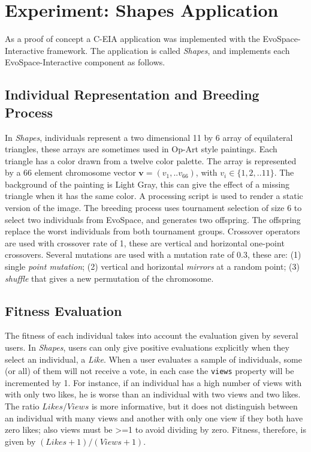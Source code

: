 \documentclass{llncs}
\begin{document}
\section{Experiment: Shapes Application}
\label{sec:experiments}
As a proof of concept a C-EIA application was implemented with the EvoSpace-Interactive framework.
The application is called \emph{Shapes}, and implements each EvoSpace-Interactive component as follows.

\subsection{Individual Representation and Breeding Process}
In \emph{Shapes}, individuals represent a two dimensional 11 by 6 array of equilateral triangles, these arrays are sometimes used in Op-Art style paintings.
Each triangle has a color drawn from a twelve color palette.
The array is represented by a 66 element chromosome vector $\mathbf{v}=(v_1,..v_{66})$, with $v_i \in \{ 1,2,..11 \}$.
The background of the painting is Light Gray, this can give the effect of a missing triangle when it has the same color.
A processing script is used to render a static version of the image.
The breeding process uses tournament selection of size 6 to select two individuals from EvoSpace,
and generates two offspring.
The offspring replace the worst individuals from both tournament groups.
Crossover operators are used with crossover rate of 1, these are vertical and horizontal one-point crossovers.
Several mutations are used with a mutation rate of 0.3, these are:
(1) single \emph{point mutation}; (2) vertical and horizontal \emph{mirrors} at a random point;
(3) \emph{shuffle} that gives a new permutation of the chromosome.



\subsection{Fitness Evaluation}
The fitness of each individual takes into account the evaluation given by several users.
In \emph{Shapes}, users can only give positive evaluations explicitly when they select an individual, a \emph{Like}.
When a user evaluates a sample of individuals, some (or all) of them will not receive a vote, in each case the \texttt{views} property will be incremented by 1.
For instance, if an individual has a high number of views with with only two likes, he is worse than an individual with two views and two likes.
The ratio $Likes/Views$ is more informative, but it does not distinguish between an individual with many views and another with only
one view if they both have zero likes; also views must be >=1 to avoid dividing by zero.
Fitness, therefore, is given by $(Likes+1)/(Views+1)$.
\end{document}
